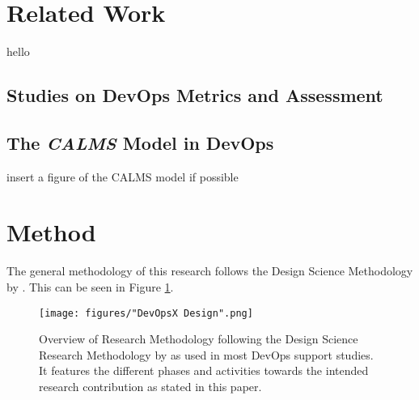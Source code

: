 \documentclass{sigchi}
\begin{document}
\section{Related Work}
hello
\subsection{Studies on DevOps Metrics and Assessment}



\subsection{The \textit{CALMS} Model in DevOps}

insert a figure of the CALMS model if possible



\section{Method}
The general methodology of this research follows the Design Science Methodology by \cite{peffers2007design}. This can be seen in Figure \ref{fig:framework}. 
\begin{figure}
    \centering
    \texttt{[image: figures/"DevOpsX Design".png]}
    \caption{Overview of Research Methodology following the Design Science Research Methodology by \cite{peffers2007design} as used in most DevOps support studies. It features the different phases and activities towards the intended research contribution as stated in this paper.}
    \label{fig:framework}
\end{figure}
\end{document}
